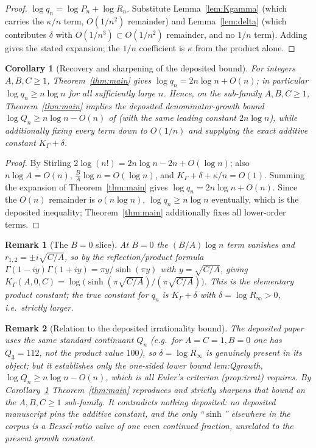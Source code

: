 \documentclass[11pt]{article}
\newtheorem{corollary}{Corollary}
\newtheorem{remark}{Remark}
\begin{document}
\begin{proof}
$\log q_n=\log P_n+\log R_n$. Substitute Lemma~\ref{lem:Kgamma} (which carries the
$\kappa/n$ term, $O(1/n^2)$ remainder) and Lemma~\ref{lem:delta} (which contributes
$\delta$ with $O(1/n^3)\subset O(1/n^2)$ remainder, and no $1/n$ term). Adding gives
the stated expansion; the $1/n$ coefficient is $\kappa$ from the product alone.
\end{proof}

\begin{corollary}[Recovery and sharpening of the deposited bound]\label{cor:recover}
For integers $A,B,C\ge1$, Theorem~\ref{thm:main} gives
$\log q_n = 2n\log n + O(n)$; in particular $\log q_n\ge n\log n$ for all
sufficiently large $n$. Hence, on the sub-family $A,B,C\ge1$, Theorem~\ref{thm:main}
implies the deposited denominator-growth bound $\log Q_n\ge n\log n-O(n)$ of
\cite{ladder} (with the same leading constant $2n\log n$), while additionally
fixing every term down to $O(1/n)$ and supplying the exact additive constant
$K_\Gamma+\delta$.
\end{corollary}

\begin{proof}
By Stirling $2\log(n!)=2n\log n-2n+O(\log n)$; also $n\log A=O(n)$,
$\tfrac{B}{A}\log n=O(\log n)$, and $K_\Gamma+\delta+\kappa/n=O(1)$. Summing the
expansion of Theorem~\ref{thm:main} gives $\log q_n=2n\log n+O(n)$. Since the
$O(n)$ remainder is $o(n\log n)$, $\log q_n\ge n\log n$ eventually, which is the
deposited inequality; Theorem~\ref{thm:main} additionally fixes all lower-order
terms.
\end{proof}

\begin{remark}[The $B=0$ slice]
At $B=0$ the $(B/A)\log n$ term vanishes and $r_{1,2}=\pm i\sqrt{C/A}$, so by the
reflection/product formula
$\Gamma(1-i y)\Gamma(1+i y)=\pi y/\sinh(\pi y)$ with $y=\sqrt{C/A}$, giving
$K_\Gamma(A,0,C)=\log\!\big(\sinh(\pi\sqrt{C/A})/(\pi\sqrt{C/A})\big)$. This is the
elementary product constant; the \emph{true} constant for $q_n$ is
$K_\Gamma+\delta$ with $\delta=\log R_\infty>0$, i.e.\ strictly larger.
\end{remark}

\begin{remark}[Relation to the deposited irrationality bound]
The deposited paper \cite{ladder} uses the same standard continuant $Q_n$ (e.g.\
for $A=C=1,B=0$ one has $Q_3=112$, not the product value $100$), so $\delta=\log
R_\infty$ is genuinely present in its object; but it establishes only the
one-sided lower bound \textsf{lem:Qgrowth}, $\log Q_n\ge n\log n-O(n)$, which is
all Euler's criterion (\textsf{prop:irrat}) requires. By Corollary~\ref{cor:recover}
Theorem~\ref{thm:main} reproduces and strictly sharpens that bound on the
$A,B,C\ge1$ sub-family. It contradicts nothing deposited: no deposited manuscript
pins the additive constant, and the only ``$\sinh$'' elsewhere in the corpus is a
Bessel-ratio \emph{value} of one even continued fraction, unrelated to the present
growth constant.
\end{remark}
\end{document}
